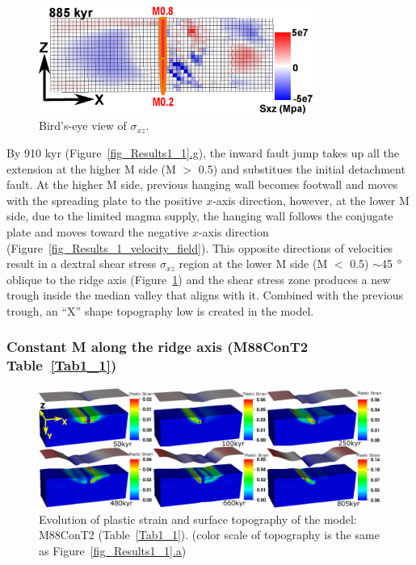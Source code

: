 \begin{figure}[h]
  \centering
    \includegraphics[width=0.8\textwidth]{./Figures/fig_Results_1_Sxz.eps}
  \caption{Bird's-eye view of $\sigma_{xz}$.}
 \label{fig_Results_1_Sxz}
\end{figure}

By 910 kyr (Figure~\hyperref[fig_Results1_1]{\ref{fig_Results1_1}.g}), the inward fault jump takes up all the extension at the higher M side (M $>$ 0.5) and substitues the initial detachment fault. At the higher M side, previous hanging wall becomes footwall and moves with the spreading plate to the positive $x$-axis direction, however, at the lower M side, due to the limited magma supply, the hanging wall follows the conjugate plate and moves toward the negative $x$-axis direction (Figure~\hyperref[fig_Results_1_velocity_field]{\ref{fig_Results_1_velocity_field}}). This opposite directions of velocities result in a dextral shear stress $\sigma_{xz}$ region at the lower M side (M $<$ 0.5) $\sim$45 $\degree$ oblique to the ridge axis (Figure~\hyperref[fig_Results_1_Sxz]{\ref{fig_Results_1_Sxz}}) and the shear stress zone produces a new trough inside the median valley that aligns with it. Combined with the previous trough, an ``X'' shape topography low is created in the model.

\subsubsection{Constant M along the ridge axis (M88ConT2 Table~\hyperref[Tab1_1]{\ref{Tab1_1}})}

\begin{figure}[h]
  \centering
    \includegraphics[width=1.0\textwidth]{./Figures/fig_Results1_3.eps}
  \caption{Evolution of plastic strain and surface topography of the model: M88ConT2 (Table~\hyperref[Tab1_1]{\ref{Tab1_1}}). (color scale of topography is the same as Figure~\hyperref[fig_Results1_1]{\ref{fig_Results1_1}.a})}
 \label{fig_Results1_3}
\end{figure}   

